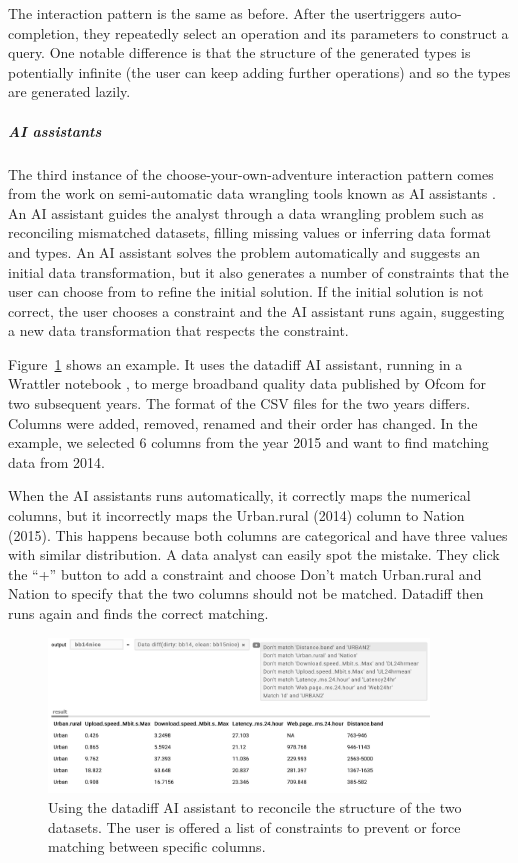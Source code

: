 \documentclass[a4paper,UKenglish,cleveref, autoref, thm-restate]{lipics-v2021}
\newcommand{\ident}[1]{\textsf{#1}}
\begin{document}
The interaction pattern is the same as before. After the usertriggers auto-completion, they
repeatedly select an operation and its parameters to construct a query. One notable difference
is that the structure of the generated types is potentially infinite (the user can keep adding
further operations) and so the types are generated lazily.

\subparagraph{AI assistants}

The third instance of the choose-your-own-adventure interaction pattern comes from the work on
semi-automatic data wrangling tools known as AI assistants \cite{petricek-2023-aias}.
An AI assistant guides the analyst through a data wrangling problem such as reconciling mismatched
datasets, filling missing values or inferring data format and types. An AI assistant solves
the problem automatically and suggests an initial data transformation, but it also generates a
number of constraints that the user can choose from to refine the initial solution. If the initial
solution is not correct, the user chooses a constraint and the AI assistant runs again, suggesting
a new data transformation that respects the constraint.

Figure~\ref{fig:aia} shows an example. It uses the datadiff \cite{sutton-2018-datadiff} AI
assistant, running in a Wrattler notebook \cite{petricek-2018-wrattler}, to merge broadband
quality data published by Ofcom for two subsequent years. The format of the CSV files for the
two years differs. Columns were added, removed, renamed and their order has changed. In the
example, we selected 6 columns from the year 2015 and want to find matching data from 2014.

When the AI assistants runs automatically, it correctly maps the numerical columns, but it
incorrectly maps the \ident{Urban.rural} (2014) column to \ident{Nation} (2015). This happens
because both columns are categorical and have three values with similar distribution. A data
analyst can easily spot the mistake. They click the ``+'' button to add a constraint and choose
\ident{Don't match Urban.rural and Nation} to specify that the two columns should not be matched.
Datadiff then runs again and finds the correct matching.

\begin{figure}[t]
  \includegraphics[width=0.9\textwidth]{fig/aia.png}
  \caption{Using the datadiff AI assistant to reconcile the structure of the two datasets.
    The user is offered a list of constraints to prevent or force matching between specific columns.}
  \label{fig:aia}
\end{figure}
\end{document}
